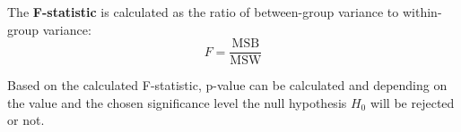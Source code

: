 The \textbf{F-statistic} is calculated as the ratio of between-group variance
to within-group variance:
\[
F = \frac{\text{MSB}}{\text{MSW}}
\]


Based on the calculated F-statistic, p-value can be calculated and depending on
the value and the chosen significance level the null hypothesis $H_0$ will be
rejected or not.
